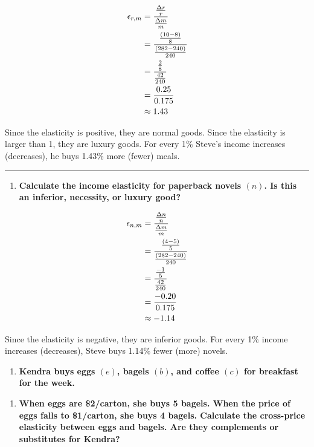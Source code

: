 \documentclass[
  11pt,
]{article}
\providecommand{\tightlist}{%
  \setlength{\itemsep}{0pt}\setlength{\parskip}{0pt}}
\begin{document}
\[\begin{aligned}
    \epsilon_{r,m}&=\cfrac{\frac{\Delta r}{r}}{\frac{\Delta m}{m}}\\
    &=\cfrac{\frac{(10-8)}{8}}{\frac{(282-240)}{240}}\\
    &=\cfrac{\frac{2}{8}}{\frac{42}{240}}\\
    &=\frac{0.25}{0.175}\\
    &\approx 1.43
    \end{aligned}\]

Since the elasticity is positive, they are normal goods. Since the
elasticity is larger than 1, they are luxury goods. For every 1\%
Steve's income increases (decreases), he buys 1.43\% more (fewer) meals.

\begin{center}\rule{0.5\linewidth}{0.5pt}\end{center}

\begin{enumerate}
\def\labelenumi{\alph{enumi}.}
\setcounter{enumi}{1}
\tightlist
\item
  \textbf{Calculate the income elasticity for paperback novels \((n)\).
  Is this an inferior, necessity, or luxury good?}
\end{enumerate}

\[\begin{aligned}
    \epsilon_{n,m}&=\cfrac{\frac{\Delta n}{n}}{\frac{\Delta m}{m}}\\
    &=\cfrac{\frac{(4-5)}{5}}{\frac{(282-240)}{240}}\\
    &=\cfrac{\frac{-1}{5}}{\frac{42}{240}}\\
    &=\frac{-0.20}{0.175}\\
    &\approx -1.14
    \end{aligned}\]

Since the elasticity is negative, they are inferior goods. For every 1\%
income increases (decreases), Steve buys 1.14\% fewer (more) novels.

\clearpage

\begin{enumerate}
\def\labelenumi{\arabic{enumi}.}
\setcounter{enumi}{5}
\tightlist
\item
  \textbf{Kendra buys eggs \((e)\), bagels \((b)\), and coffee \((c)\)
  for breakfast for the week.}
\end{enumerate}

\begin{enumerate}
\def\labelenumi{\alph{enumi}.}
\tightlist
\item
  \textbf{When eggs are \$2/carton, she buys 5 bagels. When the price of
  eggs falls to \$1/carton, she buys 4 bagels. Calculate the cross-price
  elasticity between eggs and bagels. Are they complements or
  substitutes for Kendra?}
\end{enumerate}
\end{document}
